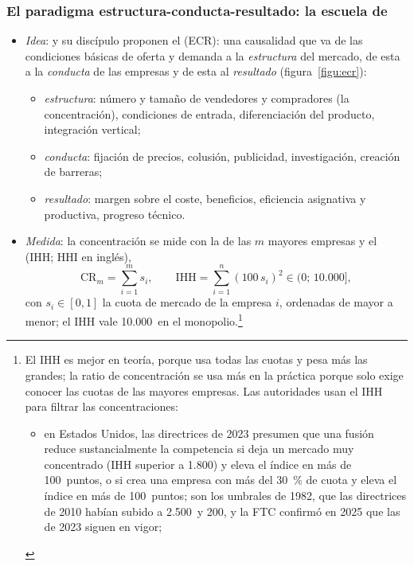 \documentclass[11pt]{article}
\begin{document}
\subsubsection{El paradigma estructura-conducta-resultado: la escuela de }\label{sec:ecr}

\begin{itemize}
\item \emph{Idea}: \textcite{Mason1939Price} y su discípulo \textcite{Bain1951Relation,Bain1956Barriers,Bain1959Industrial} proponen el  (ECR): una causalidad que va de las condiciones básicas de oferta y demanda a la \emph{estructura} del mercado, de esta a la \emph{conducta} de las empresas y de esta al \emph{resultado} (figura~\ref{figu:ecr}):
  \begin{itemize}
  \item \emph{estructura}: número y tamaño de vendedores y compradores (la concentración), condiciones de entrada, diferenciación del producto, integración vertical;
  \item \emph{conducta}: fijación de precios, colusión, publicidad, investigación, creación de barreras;
  \item \emph{resultado}: margen sobre el coste, beneficios, eficiencia asignativa y productiva, progreso técnico.
  \end{itemize}
\item \emph{Medida}: la concentración se mide con la  de las $m$ mayores empresas y el  (IHH; HHI en inglés),
  \[
  \mathrm{CR}_m=\sum_{i=1}^{m}s_i,\qquad \mathrm{IHH}=\sum_{i=1}^{n}(100\,s_i)^{2}\in(0;\,10.000],
  \]
  con $s_i\in[0,1]$ la cuota de mercado de la empresa $i$, ordenadas de mayor a menor; el IHH vale 10.000~en el monopolio.\footnote{El IHH es mejor en teoría, porque usa todas las cuotas y pesa más las grandes; la ratio de concentración se usa más en la práctica porque solo exige conocer las cuotas de las mayores empresas. Las autoridades usan el IHH para filtrar las concentraciones:
\begin{itemize}
\item en Estados Unidos, las directrices de 2023 presumen que una fusión reduce sustancialmente la competencia si deja un mercado muy concentrado (IHH superior a 1.800) y eleva el índice en más de 100~puntos, o si crea una empresa con más del 30~\% de cuota y eleva el índice en más de 100~puntos\nocite{DOJFTC2023Merger}; son los umbrales de 1982, que las directrices de 2010 habían subido a 2.500~y 200\nocite{DOJ1982Merger,DOJFTC2010Horizontal}, y la FTC confirmó en 2025 que las de 2023 siguen en vigor\nocite{FTC2025Ferguson};

\end{itemize}}
\end{itemize}
\end{document}
